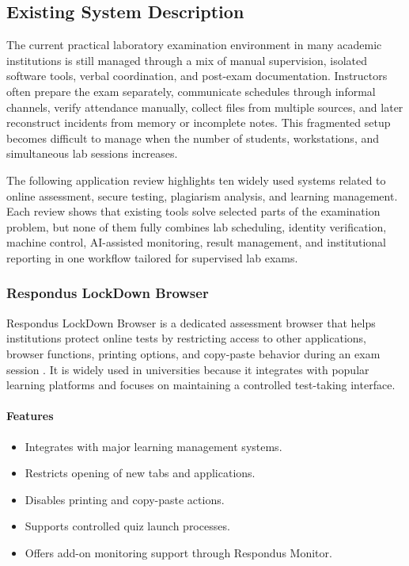 \subsection{Existing System Description}

The current practical laboratory examination environment in many academic institutions is still managed through a mix of manual supervision, isolated software tools, verbal coordination, and post-exam documentation. Instructors often prepare the exam separately, communicate schedules through informal channels, verify attendance manually, collect files from multiple sources, and later reconstruct incidents from memory or incomplete notes. This fragmented setup becomes difficult to manage when the number of students, workstations, and simultaneous lab sessions increases.

The following application review highlights ten widely used systems related to online assessment, secure testing, plagiarism analysis, and learning management. Each review shows that existing tools solve selected parts of the examination problem, but none of them fully combines lab scheduling, identity verification, machine control, AI-assisted monitoring, result management, and institutional reporting in one workflow tailored for supervised lab exams.

\subsubsection{Respondus LockDown Browser}
Respondus LockDown Browser is a dedicated assessment browser that helps institutions protect online tests by restricting access to other applications, browser functions, printing options, and copy-paste behavior during an exam session \cite{respondus1}. It is widely used in universities because it integrates with popular learning platforms and focuses on maintaining a controlled test-taking interface.

\paragraph{Features}
\begin{itemize}[noitemsep]
\item Integrates with major learning management systems.
\item Restricts opening of new tabs and applications.
\item Disables printing and copy-paste actions.
\item Supports controlled quiz launch processes.
\item Offers add-on monitoring support through Respondus Monitor.
\end{itemize}


